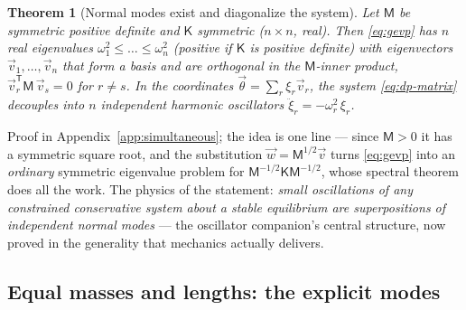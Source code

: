 \documentclass[11pt]{article}
\theoremstyle{plain}
\newtheorem{theorem}{Theorem}[section]
\theoremstyle{definition}
\theoremstyle{remark}
\newcommand{\vth}{\vec{\theta}}
\newcommand{\mM}{\mathsf{M}}
\newcommand{\mK}{\mathsf{K}}
\begin{document}
\begin{theorem}[Normal modes exist and diagonalize the system]
\label{thm:simultaneous}
Let $\mM$ be symmetric positive definite and $\mK$ symmetric ($n\times n$,
real). Then \eqref{eq:gevp} has $n$ real eigenvalues
$\omega_1^2 \le \dots \le \omega_n^2$ (positive if $\mK$ is positive
definite) with eigenvectors $\vec v_1,\dots,\vec v_n$ that form a basis
and are orthogonal in the $\mM$-inner product,
$\vec v_r^{\mathsf T}\mM\,\vec v_s = 0$ for $r\ne s$. In the coordinates
$\vth = \sum_r \xi_r \vec v_r$, the system \eqref{eq:dp-matrix} decouples
into $n$ independent harmonic oscillators
$\ddot\xi_r = -\omega_r^2\,\xi_r$.
\end{theorem}

Proof in Appendix~\ref{app:simultaneous}; the idea is one line --- since
$\mM > 0$ it has a symmetric square root, and the substitution
$\vec w = \mM^{1/2}\vec v$ turns \eqref{eq:gevp} into an \emph{ordinary}
symmetric eigenvalue problem for $\mM^{-1/2}\mK\mM^{-1/2}$, whose spectral
theorem does all the work. The physics of the statement: \emph{small
oscillations of any constrained conservative system about a stable
equilibrium are superpositions of independent normal modes} --- the
oscillator companion's central structure, now proved in the generality
that mechanics actually delivers.

\subsection{Equal masses and lengths: the explicit modes}
\label{sec:dp-explicit}
\end{document}
